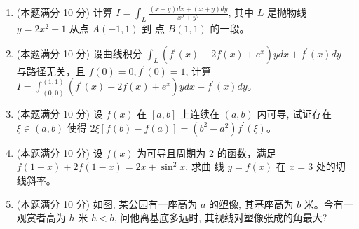 \begin{enumerate}
\newpage
\item
(本题满分 10 分)	
计算 $I=\int_{L} \frac{(x-y) d x+(x+y) d y}{x^{2}+y^{2}}$, 其中 $L$ 是抛物线 $y=2 x^{2}-1$ 从点 $A(-1,1)$ 到 点 $B(1,1)$ 的一段。



\item
(本题满分 10 分)	
设曲线积分 $\int_{L}\left(f^{\prime}(x)+2 f(x)+e^{x}\right) y d x+f^{\prime}(x) d y$ 与路径无关，且 $f(0)=0, f^{\prime}(0)=1$, 计算 $I=\int_{(0,0)}^{(1,1)}\left(f^{\prime}(x)+2 f(x)+e^{x}\right) y d x+f^{\prime}(x) d y$。



\item
(本题满分 10 分)	
设 $f(x)$ 在 $[a, b]$ 上连续在 $(a, b)$ 内可导, 试证存在 $\xi \in(a, b)$ 使得 $2 \xi[f(b)-f(a)]=\left(b^{2}-a^{2}\right) f^{\prime}(\xi)$。


	

\item
(本题满分 10 分)	
设 $f(x)$ 为可导且周期为 2 的函数，满足 $f(1+x)+2 f(1-x)=2 x+\sin ^{2} x$, 求曲 线 $y=f(x)$ 在 $x=3$ 处的切线斜率。
	

\item
(本题满分 10 分)	
如图, 某公园有一座高为 $a$ 的塑像, 其基座高为 $b$ 米。今有一观赏者高为 $h$ 米 $h<b$, 问他离基底多远时, 其视线对塑像张成的角最大?
\begin{figure}[h!]
	\flushright
	
\end{figure}

	





\end{enumerate}


